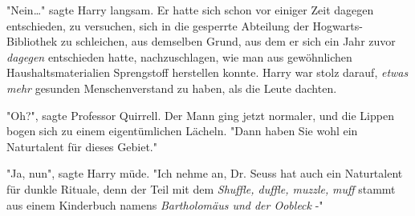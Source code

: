 {"Nein…" sagte Harry langsam. Er hatte sich schon vor einiger Zeit dagegen entschieden, zu versuchen, sich in die gesperrte Abteilung der Hogwarts-Bibliothek zu schleichen, aus demselben Grund, aus dem er sich ein Jahr zuvor \emph{dagegen} entschieden hatte, nachzuschlagen, wie man aus gewöhnlichen Haushaltsmaterialien Sprengstoff herstellen konnte. Harry war stolz darauf, \emph{etwas} \emph{mehr} gesunden Menschenverstand zu haben, als die Leute dachten.

"Oh?", sagte Professor Quirrell. Der Mann ging jetzt normaler, und die Lippen bogen sich zu einem eigentümlichen Lächeln. "Dann haben Sie wohl ein Naturtalent für dieses Gebiet."

"Ja, nun", sagte Harry müde. "Ich nehme an, Dr. Seuss hat auch ein Naturtalent für dunkle Rituale, denn der Teil mit dem \emph{Shuffle, duffle, muzzle,} \emph{muff} stammt aus einem Kinderbuch namens \emph{Bartholomäus und der Oobleck} -"

}
